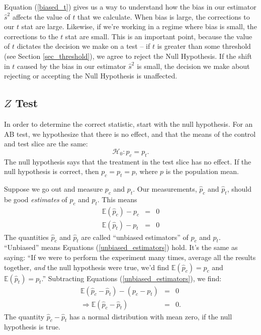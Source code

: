 \documentclass{article}
\numberwithin{equation}{section}
\begin{document}
Equation (\ref{biased_t}) gives us a way to understand how the bias in our estimator $\hat{s}^2$ affects the value of $t$ that we calculate. When bias is large, the corrections to our $t$ stat are large. Likewise, if we're working in a regime where bias is small, the corrections to the $t$ stat are small. This is an important point, because the value of $t$ dictates the decision we make on a test -- if $t$ is greater than some threshold (see Section \ref{sec_threshold}), we agree to reject the Null Hypothesis. If the shift in $t$ caused by the bias in our estimator $\hat{s}^2$ is small, the decision we make about rejecting or accepting the Null Hypothesis is unaffected.

\subsection{$Z$ Test \label{sec_z_test}}

In order to determine the correct statistic, start with the null hypothesis. For an AB test, we hypothesize that there is no effect, and that the means of the control and test slice are the same:
\begin{equation} \label{null_hypothesis}
	\mathcal{H}_0: p_c = p_t.
\end{equation}
The null hypothesis says that the treatment in the test slice has no effect. If the null hypothesis is correct, then $p_c = p_t = p$, where $p$ is the population mean. 

Suppose we go out and measure $p_c$ and $p_t$. Our measurements, $\hat{p}_c$ and $\hat{p}_t$, should be good \textit{estimates} of $p_c$ and $p_t$. This means
\begin{eqnarray}  \nonumber \label{unbiased_estimators}
	\mathbb{E}(\hat{p}_c) - p_c &=& 0 \\
	\mathbb{E}(\hat{p}_t) - p_t &=& 0
\end{eqnarray}
The quantities $\hat{p}_c$ and $\hat{p}_t$ are called ``unbiased estimators'' of $p_c$ and $p_t$. ``Unbiased'' means Equations (\ref{unbiased_estimators}) hold. It's the same as saying: ``If we were to perform the experiment many times, average all the results together, \textit{and} the null hypothesis were true, we'd find $\mathbb{E}\left(\hat{p}_c\right) = p_c$ and $\mathbb{E}\left(\hat{p}_t\right) = p_t$.'' Subtracting Equations (\ref{unbiased_estimators}), we find:
\begin{eqnarray} \label{z_num} \nonumber
	\mathbb{E}\left(\hat{p}_c - \hat{p}_t\right) - \left(p_c - p_t\right) &=& 0 \\
	\Rightarrow \mathbb{E}\left(\hat{p}_c - \hat{p}_t\right) &=& 0.
\end{eqnarray}
The quantity $\hat{p}_c - \hat{p}_t$ has a normal distribution with mean zero, if the null hypothesis is true. 
\end{document}
